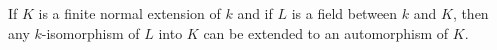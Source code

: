 If $K$ is a finite normal extension of $k$ and if $L$ is a field between $k$ and $K$, then any $k$-isomorphism of $L$ into $K$ can be extended to an automorphism of $K$.
